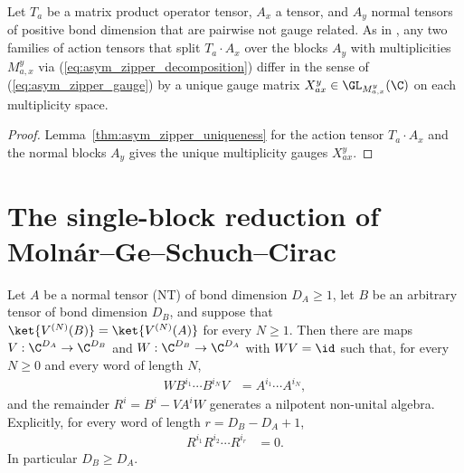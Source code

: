 \begin{corollary}
    \label{cor:asym_zipper_action_uniqueness}
    \leanok
    Let $T_a$ be a matrix product operator tensor, $A_x$ a tensor, and $A_y$
    normal tensors of positive bond dimension that are pairwise not gauge
    related. As in \cite[Section~3.1]{GarreRubio2023MPOSym}, any two families
    of action tensors that split $T_a\cdot A_x$ over the blocks $A_y$ with
    multiplicities $M_{a,x}^y$ via (\ref{eq:asym_zipper_decomposition})
    differ in the sense of (\ref{eq:asym_zipper_gauge}) by a unique gauge
    matrix $X_{ax}^y\in\GL_{M_{a,x}^y}(\C)$ on each multiplicity space.
\end{corollary}

\begin{proof}
    \leanok
    Lemma~\ref{thm:asym_zipper_uniqueness} for the action tensor
    $T_a\cdot A_x$ and the normal blocks $A_y$ gives the unique multiplicity
    gauges $X_{ax}^y$.
\end{proof}

\section{The single-block reduction of Moln\'ar--Ge--Schuch--Cirac}%
\label{sec:asym_single_block}

\begin{corollary}
    \label{cor:asym_single_block}
    \leanok
    Let $A$ be a normal tensor (NT) of bond dimension $D_A\geq1$, let $B$
    be an arbitrary tensor of bond dimension $D_B$, and suppose that
    $\ket{V^{(N)}(B)}=\ket{V^{(N)}(A)}$ for every $N\geq1$.
    Then there are maps $V:\C^{D_A}\to\C^{D_B}$ and
    $W:\C^{D_B}\to\C^{D_A}$ with $WV=\id$ such that, for every $N\geq0$
    and every word of length $N$,
    \begin{align}
        WB^{i_1}\cdots B^{i_N}V & =A^{i_1}\cdots A^{i_N},
        \label{eq:asym_single_block_compression}
    \end{align}
    and the remainder $R^i=B^i-VA^iW$ generates a nilpotent non-unital
    algebra. Explicitly, for every word of length $r=D_B-D_A+1$,
    \begin{align}
        R^{i_1}R^{i_2}\cdots R^{i_r} & =0.
        \label{eq:asym_single_block_nilpotency}
    \end{align}
    In particular $D_B\geq D_A$.
\end{corollary}

